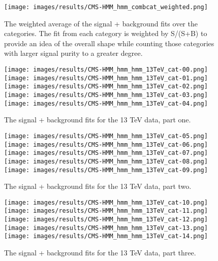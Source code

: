 \begin{figure}[h!]
    \centering
    \texttt{[image: images/results/CMS-HMM\_hmm\_combcat\_weighted.png]}
    \caption[The weighted average of the signal + background fits for 13 TeV data.]
    {The weighted average of the signal + background fits over the categories. The fit from each category is weighted by S/(S+B) to provide an idea of the overall shape while counting those categories with larger signal purity to a greater degree.}
    \label{fig:splusbweight}
\end{figure}
\begin{figure}[h!]
    \centering
    \texttt{[image: images/results/CMS-HMM\_hmm\_hmm\_13TeV\_cat-00.png]}
    \texttt{[image: images/results/CMS-HMM\_hmm\_hmm\_13TeV\_cat-01.png]}
    \texttt{[image: images/results/CMS-HMM\_hmm\_hmm\_13TeV\_cat-02.png]}
    \texttt{[image: images/results/CMS-HMM\_hmm\_hmm\_13TeV\_cat-03.png]}
    \texttt{[image: images/results/CMS-HMM\_hmm\_hmm\_13TeV\_cat-04.png]}
    \caption[Signal + background fits for the individual categories on 13 TeV data.]
    {The signal + background fits for the 13 TeV data, part one.}
    \label{fig:fitsbycat1}
\end{figure}

\begin{figure}[h!]
    \centering
    \texttt{[image: images/results/CMS-HMM\_hmm\_hmm\_13TeV\_cat-05.png]}
    \texttt{[image: images/results/CMS-HMM\_hmm\_hmm\_13TeV\_cat-06.png]}
    \texttt{[image: images/results/CMS-HMM\_hmm\_hmm\_13TeV\_cat-07.png]}
    \texttt{[image: images/results/CMS-HMM\_hmm\_hmm\_13TeV\_cat-08.png]}
    \texttt{[image: images/results/CMS-HMM\_hmm\_hmm\_13TeV\_cat-09.png]}
    \caption[More signal + background fits for the individual categories on 13 TeV data.]
    {The signal + background fits for the 13 TeV data, part two.}
    \label{fig:fitsbycat2}
\end{figure}

\begin{figure}[h!]
    \centering
    \texttt{[image: images/results/CMS-HMM\_hmm\_hmm\_13TeV\_cat-10.png]}
    \texttt{[image: images/results/CMS-HMM\_hmm\_hmm\_13TeV\_cat-11.png]}
    \texttt{[image: images/results/CMS-HMM\_hmm\_hmm\_13TeV\_cat-12.png]}
    \texttt{[image: images/results/CMS-HMM\_hmm\_hmm\_13TeV\_cat-13.png]}
    \texttt{[image: images/results/CMS-HMM\_hmm\_hmm\_13TeV\_cat-14.png]}
    \caption[The last set of signal + background fits for the individual categories on 13 TeV data.]
    {The signal + background fits for the 13 TeV data, part three.}
    \label{fig:fitsbycat3}
\end{figure}
\clearpage

